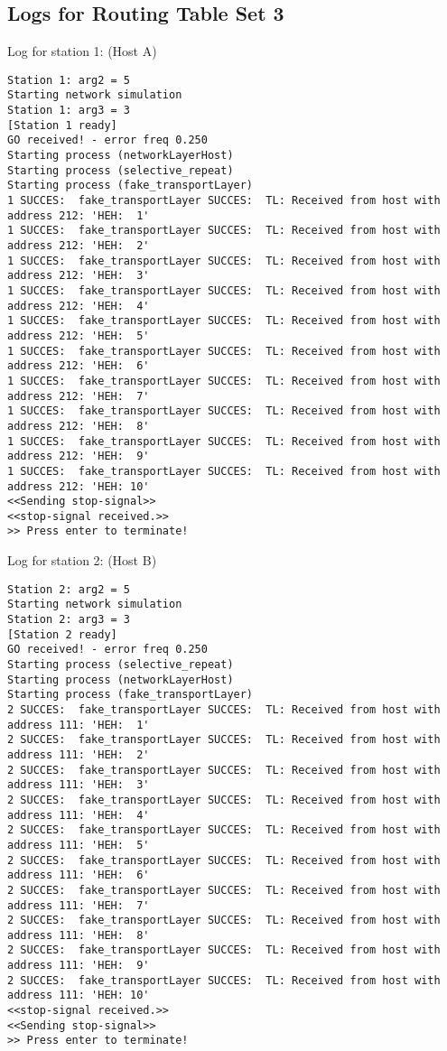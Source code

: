 \subsection{Logs for Routing Table Set 3}
Log for station 1: (Host A)
\begin{lstlisting}[breaklines=true]
Station 1: arg2 = 5
Starting network simulation
Station 1: arg3 = 3
[Station 1 ready]
GO received! - error freq 0.250
Starting process (networkLayerHost)
Starting process (selective_repeat)
Starting process (fake_transportLayer)
1 SUCCES:  fake_transportLayer SUCCES:  TL: Received from host with address 212: 'HEH:  1'
1 SUCCES:  fake_transportLayer SUCCES:  TL: Received from host with address 212: 'HEH:  2'
1 SUCCES:  fake_transportLayer SUCCES:  TL: Received from host with address 212: 'HEH:  3'
1 SUCCES:  fake_transportLayer SUCCES:  TL: Received from host with address 212: 'HEH:  4'
1 SUCCES:  fake_transportLayer SUCCES:  TL: Received from host with address 212: 'HEH:  5'
1 SUCCES:  fake_transportLayer SUCCES:  TL: Received from host with address 212: 'HEH:  6'
1 SUCCES:  fake_transportLayer SUCCES:  TL: Received from host with address 212: 'HEH:  7'
1 SUCCES:  fake_transportLayer SUCCES:  TL: Received from host with address 212: 'HEH:  8'
1 SUCCES:  fake_transportLayer SUCCES:  TL: Received from host with address 212: 'HEH:  9'
1 SUCCES:  fake_transportLayer SUCCES:  TL: Received from host with address 212: 'HEH: 10'
<<Sending stop-signal>>
<<stop-signal received.>>
>> Press enter to terminate!
\end{lstlisting}

Log for station 2: (Host B)
\begin{lstlisting}[breaklines=true]
Station 2: arg2 = 5
Starting network simulation
Station 2: arg3 = 3
[Station 2 ready]
GO received! - error freq 0.250
Starting process (selective_repeat)
Starting process (networkLayerHost)
Starting process (fake_transportLayer)
2 SUCCES:  fake_transportLayer SUCCES:  TL: Received from host with address 111: 'HEH:  1'
2 SUCCES:  fake_transportLayer SUCCES:  TL: Received from host with address 111: 'HEH:  2'
2 SUCCES:  fake_transportLayer SUCCES:  TL: Received from host with address 111: 'HEH:  3'
2 SUCCES:  fake_transportLayer SUCCES:  TL: Received from host with address 111: 'HEH:  4'
2 SUCCES:  fake_transportLayer SUCCES:  TL: Received from host with address 111: 'HEH:  5'
2 SUCCES:  fake_transportLayer SUCCES:  TL: Received from host with address 111: 'HEH:  6'
2 SUCCES:  fake_transportLayer SUCCES:  TL: Received from host with address 111: 'HEH:  7'
2 SUCCES:  fake_transportLayer SUCCES:  TL: Received from host with address 111: 'HEH:  8'
2 SUCCES:  fake_transportLayer SUCCES:  TL: Received from host with address 111: 'HEH:  9'
2 SUCCES:  fake_transportLayer SUCCES:  TL: Received from host with address 111: 'HEH: 10'
<<stop-signal received.>>
<<Sending stop-signal>>
>> Press enter to terminate!
\end{lstlisting}

